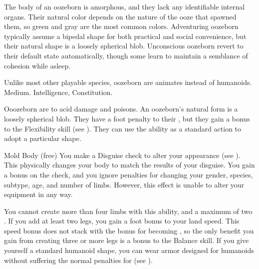    The body of an oozeborn is amorphous, and they lack any identifiable internal organs.
    Their natural color depends on the nature of the ooze that spawned them, so green and gray are the most common colors.
    Adventuring oozeborn typically assume a bipedal shape for both practical and social convenience, but their natural shape is a loosely spherical blob.
    Unconscious oozeborn revert to their default state automatically, though some learn to maintain a semblance of cohesion while asleep.

     Unlike most other playable species, oozeborn are animates instead of humanoids.
     Medium.
      Intelligence,  Constitution.
    \begin{itemize}
         Ooozeborn are  to acid damage and poisons.
         An oozeborn's natural form is a loosely spherical blob.
            They have a  foot penalty to their , but they gain a  bonus to the Flexibility skill (see ).
            They can use the  ability as a standard action to adopt a particular shape.
            \begin{sustainability}{Mold Body}{ (free)}
                \rankline
                You make a Disguise check to alter your appearance (see ).
                This physically changes your body to match the results of your disguise.
                You gain a  bonus on the check, and you ignore penalties for changing your gender, species, subtype, age, and number of limbs.
                However, this effect is unable to alter your equipment in any way.

                You cannot create more than four limbs with this ability, and a maximum of two .
                If you add at least two legs, you gain a  foot bonus to your land speed.
                This speed bonus does not stack with the bonus for becoming , so the only benefit you gain from creating three or more legs is a  bonus to the Balance skill.
                If you give yourself a standard humanoid shape, you can wear armor designed for humanoids without suffering the normal penalties for  (see ).


\end{sustainability}
\end{itemize}
